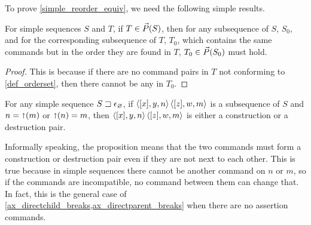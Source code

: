 To prove \cref{simple_reorder_equiv}, we need the following simple results.

\begin{myclm}
For simple sequences $S$ and $T$,
if $T\in\vec{P}({S})$, then for any subsequence of $S$, $S_0$,
and for the corresponding subsequence of $T$, $T_0$, which
contains the same commands but in the order they are found in $T$,
$T_0\in\vec{P}({S_0})$ must hold.
\end{myclm}
\begin{proof}
This is because
if there are no command pairs in $T$ not conforming to \cref{def_orderset},
then there cannot be any in $T_0$.
\end{proof}



\begin{mylem}
For any simple sequence ${S}\sqsupset\epsilon_\varnothing$,
if $\langle{[x],y,n}\rangle\,\langle{[z],w,m}\rangle$ is a subsequence of $S$ and $n=\mathord{\shortuparrow}(m)$ or $\mathord{\shortuparrow}(n)=m$,
then $\langle{[x],y,n}\rangle\,\langle{[z],w,m}\rangle$ is either a construction or a destruction pair.
\end{mylem}

Informally speaking, the proposition means that
the two commands must form a construction or destruction pair even
if they are not next to each other.
This is true because in simple sequences
there cannot be another command on $n$ or $m$,
so if the commands are incompatible, no command between them can change that.
In fact, this  is the general case
of \cref{ax_directchild_breaks,ax_directparent_breaks} when there are no assertion commands.

